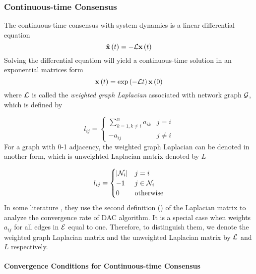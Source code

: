 \subsubsection{Continuous-time Consensus}

The continuous-time consensus with system dynamics 
is a linear differential equation 
\begin{equation}
\mathbf{\dot{x}}\left(t\right)=-{\cal L}\mathbf{x}\left(t\right)\label{eq:system differential dynamics}
\end{equation}
Solving the differential equation 
will yield a continuous-time solution in an exponential matrices form
\begin{equation}
\mathbf{x}\left(t\right)=\exp\left(-{\cal L}t\right)\mathbf{x}\left(0\right)\label{eq:x(t) of CT-1st-DAC}
\end{equation}
where ${\cal L}$ is called the \textit{weighted graph Laplacian}
associated with network graph ${\cal G}$, which is defined by

\begin{equation}
l_{ij}=\begin{cases}
\sum_{k=1,k\neq i}^{n}a_{ik} & j=i\\
-a_{ij} & j\neq i
\end{cases}\label{eq:Graph Laplacian def.}
\end{equation}
For a graph with 0-1 adjacency, the weighted graph Laplacian can be
denoted in another form, which is unweighted Laplacian matrix denoted
by $L$

\begin{equation}
l_{ij}=\begin{cases}
\left|{\cal N}_{i}\right| & j=i\\
-1 & j\in{\cal N}_{i}\\
0 & \mbox{otherwise}
\end{cases}\label{eq:Laplacian def.}
\end{equation}
In some literature \cite{Xiong2009a}, they use the second definition
() of the Laplacian matrix to analyze
the convergence rate of DAC algorithm. It is a special case when weights
$a_{ij}$ for all edges in ${\cal E}$ equal to one. Therefore, to
distinguish them, we denote the weighted graph Laplacian matrix and
the unweighted Laplacian matrix by ${\cal L}$ and $L$ respectively. 


\paragraph*{Convergence Conditions for Continuous-time Consensus}

